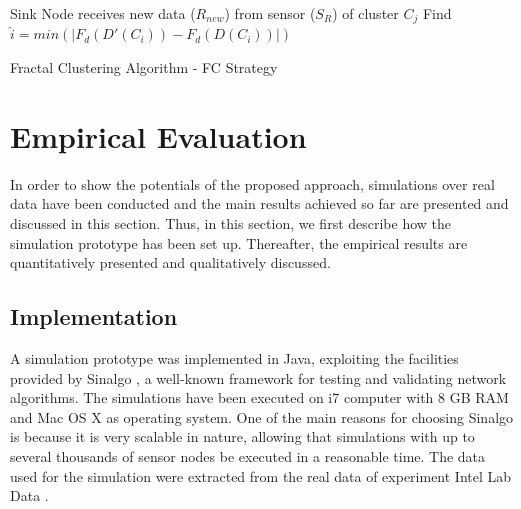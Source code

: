 \documentclass{acm_proc_article-sp}
\begin{document}
\begin{algorithm}
 \SetAlgoLined
 \LinesNumbered
 \small
 Sink Node receives new data ($R_{new}$) from sensor ($S_{R}$) of cluster $C_j$\;
  Find $\hat{i} = min(|F_d(D'(C_i)) - F_d(D(C_i))|)$\;
 
 \caption{Fractal Clustering Algorithm - FC Strategy}
 \label{alg:MDFD}
\end{algorithm}


\section{Empirical Evaluation}
\label{eval}

In order to show the potentials of the proposed approach, simulations over real
data have been conducted and the main results achieved so far are presented and
discussed in this section. Thus, in this section, we first describe how the
simulation prototype has been set up. Thereafter, the empirical results are
quantitatively presented and qualitatively discussed.

\subsection{Implementation}
\label{implementation}

A simulation prototype was implemented in Java, exploiting the facilities
provided by Sinalgo \cite{Sinalgo2007}, a well-known framework for testing and
validating network algorithms. The simulations have been executed on i7 computer
with 8 GB RAM and Mac OS X as operating system.
One of the main reasons for choosing Sinalgo is because it is very scalable in
nature, allowing that simulations with up to several thousands of sensor nodes
be executed in a reasonable time. The data used for the simulation were
extracted from the real data of experiment Intel Lab Data \cite{Intel2004}. 
\end{document}
